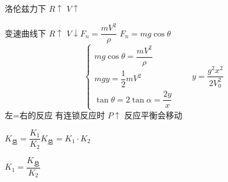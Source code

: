 洛伦兹力下 $R\uparrow$ $V\uparrow$

变速曲线下 $R\uparrow$ $V\downarrow$\qquad $F_n=\dfrac{mV^2}{\rho}$
$F_n=mg\cos\theta$
\[
\begin{cases}
mg\cos\theta=\dfrac{mV^2}{\rho}\\[4pt]
mgy=\dfrac12mV^2\\[4pt]
\tan\theta=2\tan\alpha=\dfrac{2y}{x}
\end{cases}
\qquad
y=\dfrac{g^2x^2}{2V_0^2}
\]
左=右的反应 有连锁反应时 $P\uparrow$ 反应平衡会移动

$K_{\text{总}}=\dfrac{K_1}{K_2}$\qquad $K_{\text{总}}=K_1\cdot K_2$

\hspace{4.2cm}$K_1=\dfrac{K_{\text{总}}}{K_2}$
